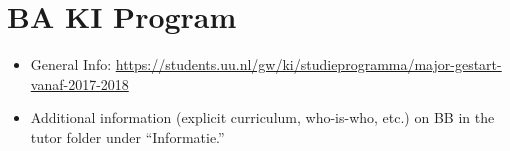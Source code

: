 \chapter{BA KI Program}

	\begin{itemize}

		\item General Info: \href{https://students.uu.nl/gw/ki/studieprogramma/major-gestart-vanaf-2017-2018}{https://students.uu.nl/gw/ki/studieprogramma/major-gestart-vanaf-2017-2018}

		\item Additional information (explicit curriculum, who-is-who, etc.) on BB in the tutor folder under ``Informatie.''

	\end{itemize}
